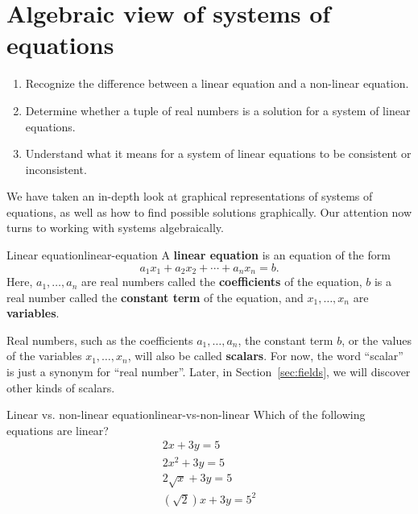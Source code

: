 \section{Algebraic view of systems of equations}

\begin{outcome}
  \begin{enumerate}
  \item Recognize the difference between a linear equation and a
    non-linear equation.
  \item Determine whether a tuple of real numbers is a solution for a
    system of linear equations.
  \item Understand what it means for a system of linear equations to
    be consistent or inconsistent.
  \end{enumerate}
\end{outcome}

We have taken an in-depth look at graphical representations of systems of equations, as well as how to find possible
solutions graphically. Our attention now turns to working with systems algebraically. 

\begin{definition}{Linear equation}{linear-equation}
A \textbf{linear equation} is an equation of
the form
\begin{equation*}
  a_1x_1 + a_2x_2 + \cdots + a_nx_n = b.
\end{equation*}
Here, $a_1,\ldots,a_n$ are real numbers called the
\textbf{coefficients} of the equation, $b$ is a
real number called the \textbf{constant term}
of the equation, and $x_1,\ldots,x_n$ are
\textbf{variables}.
\end{definition}

Real numbers, such as the coefficients $a_1,\ldots,a_n$, the constant
term $b$, or the values of the variables $x_1,\ldots,x_n$, will also
be called \textbf{scalars}. For now, the word
``scalar'' is just a synonym for ``real number''. Later, in
Section~\ref{sec:fields}, we will discover other kinds of scalars. 

\begin{example}{Linear vs. non-linear equation}{linear-vs-non-linear}
  Which of the following equations are linear?
  \begin{equation*}
    \begin{array}{c}
      2x+3y=5\\
      2x^2+3y=5\\
      2\sqrt{x} + 3y = 5\\
      (\sqrt{2}) x + 3y = 5^2
    \end{array}
  \end{equation*}
\end{example}

